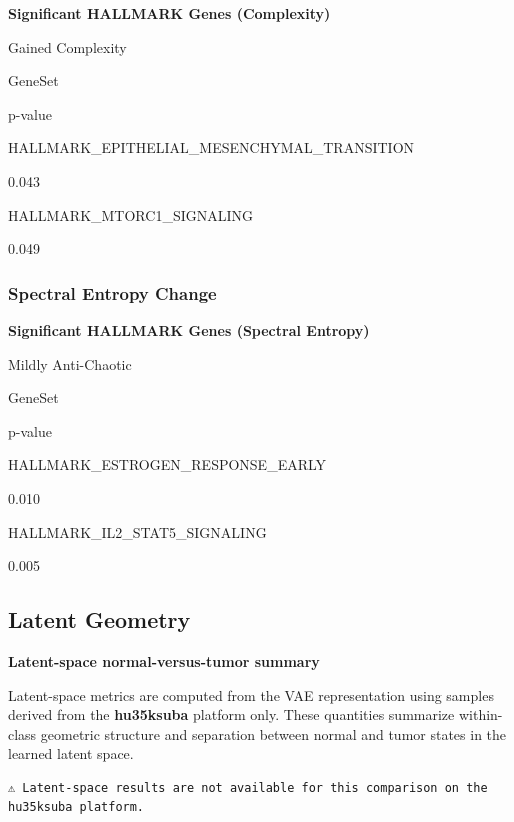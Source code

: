 \documentclass[
  letterpaper,
  DIV=11,
  numbers=noendperiod,
  openany,
  oneside]{scrreprt}
\begin{document}
\textbf{Significant HALLMARK Genes (Complexity)}

Gained Complexity

GeneSet

p-value

HALLMARK\_EPITHELIAL\_MESENCHYMAL\_TRANSITION

0.043

HALLMARK\_MTORC1\_SIGNALING

0.049

\subsubsection{Spectral Entropy Change}

\textbf{Significant HALLMARK Genes (Spectral Entropy)}

Mildly Anti-Chaotic

GeneSet

p-value

HALLMARK\_ESTROGEN\_RESPONSE\_EARLY

0.010

HALLMARK\_IL2\_STAT5\_SIGNALING

0.005

\subsection{Latent Geometry}

\textbf{Latent-space normal-versus-tumor summary}

Latent-space metrics are computed from the VAE representation using
samples derived from the \textbf{hu35ksuba} platform only. These
quantities summarize within-class geometric structure and separation
between normal and tumor states in the learned latent space.

\begin{verbatim}
⚠️ Latent-space results are not available for this comparison on the hu35ksuba platform.
\end{verbatim}
\end{document}
